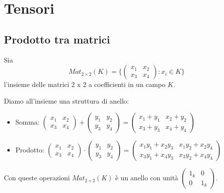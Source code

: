 \documentclass[../main.tex]{subfiles}
\begin{document}
\chapter{Tensori}
\section{Prodotto tra matrici}
\begin{definition}
    Sia
    \begin{equation*}
        Mat_{2 \times 2}(K) = \{\begin{pmatrix} x_1 & x_2 \\ x_3 & x_4 \end{pmatrix} : x_i \in K \}
    \end{equation*}
    l'insieme delle matrici 2 x 2 a coefficienti in un campo $K$.
\end{definition}
Diamo all'insieme una struttura di anello:
\begin{itemize}
    \item Somma: $\begin{pmatrix} x_1 & x_2 \\ x_3 & x_4 \end{pmatrix} + \begin{pmatrix} y_1 & y_2 \\ y_3 & y_4 \end{pmatrix} = \begin{pmatrix} x_1 + y_1 & x_2 + y_2 \\ x_3 + y_3 & x_4 + y_4 \end{pmatrix}$
    \item Prodotto: $\begin{pmatrix} x_1 & x_2 \\ x_3 & x_4 \end{pmatrix} \cdot \begin{pmatrix} y_1 & y_2 \\ y_3 & y_4 \end{pmatrix} = \begin{pmatrix} x_1 y_1 + x_2 y_3 & x_1 y_2 + x_2 y_4 \\ x_3 y_1 + x_4 y_3 & x_3 y_2 + x_4 y_4 \end{pmatrix}$
\end{itemize}
Con queste operazioni $Mat_{2 \times 2}(K)$ è un anello con unità
$\begin{pmatrix} 1_k & 0 \\ 0 & 1_k \end{pmatrix}$.
\end{document}
